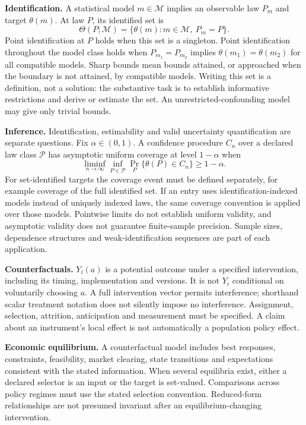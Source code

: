 \documentclass[11pt,a4paper]{article}
\begin{document}
\textbf{Identification.} A statistical model $m\in\mathcal M$ implies an observable law $P_m$ and target $\theta(m)$. At law $P$, its identified set is
\[
\Theta(P;\mathcal M)=\{\theta(m):m\in\mathcal M,\ P_m=P\}.
\]
Point identification at $P$ holds when this set is a singleton. Point identification throughout the model class holds when $P_{m_1}=P_{m_2}$ implies $\theta(m_1)=\theta(m_2)$ for all compatible models. Sharp bounds mean bounds attained, or approached when the boundary is not attained, by compatible models. Writing this set is a definition, not a solution: the substantive task is to establish informative restrictions and derive or estimate the set. An unrestricted-confounding model may give only trivial bounds.

\textbf{Inference.} Identification, estimability and valid uncertainty quantification are separate questions. Fix $\alpha\in(0,1)$. A confidence procedure $C_n$ over a declared law class $\mathcal P$ has asymptotic uniform coverage at level $1-\alpha$ when
\[
\liminf_{n\to\infty}\inf_{P\in\mathcal P}\Pr_P\{\theta(P)\in C_n\}\geq1-\alpha.
\]
For set-identified targets the coverage event must be defined separately, for example coverage of the full identified set. If an entry uses identification-indexed models instead of uniquely indexed laws, the same coverage convention is applied over those models. Pointwise limits do not establish uniform validity, and asymptotic validity does not guarantee finite-sample precision. Sample sizes, dependence structures and weak-identification sequences are part of each application.

\textbf{Counterfactuals.} $Y_i(a)$ is a potential outcome under a specified intervention, including its timing, implementation and versions. It is not $Y_i$ conditional on voluntarily choosing $a$. A full intervention vector permits interference; shorthand scalar treatment notation does not silently impose no interference. Assignment, selection, attrition, anticipation and measurement must be specified. A claim about an instrument's local effect is not automatically a population policy effect.

\textbf{Economic equilibrium.} A counterfactual model includes best responses, constraints, feasibility, market clearing, state transitions and expectations consistent with the stated information. When several equilibria exist, either a declared selector is an input or the target is set-valued. Comparisons across policy regimes must use the stated selection convention. Reduced-form relationships are not presumed invariant after an equilibrium-changing intervention.
\end{document}
